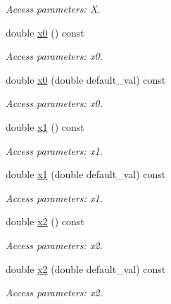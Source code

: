 \begin{DoxyCompactItemize}
\begin{DoxyCompactList}\small\item\em Access parameters: X. \item\end{DoxyCompactList}\item 
double \hyperlink{struct_d_d4hep_1_1_x_m_l_1_1_dimension_a6d683ef00556655f120526b2ed32b805}{x0} () const 
\begin{DoxyCompactList}\small\item\em Access parameters: x0. \item\end{DoxyCompactList}\item 
double \hyperlink{struct_d_d4hep_1_1_x_m_l_1_1_dimension_abb8c3f1185f84d41aa23b2650723290e}{x0} (double default\_\-val) const 
\begin{DoxyCompactList}\small\item\em Access parameters: x0. \item\end{DoxyCompactList}\item 
double \hyperlink{struct_d_d4hep_1_1_x_m_l_1_1_dimension_a6ab0a2e9f1c1b8b32bedb25bd8a86c03}{x1} () const 
\begin{DoxyCompactList}\small\item\em Access parameters: x1. \item\end{DoxyCompactList}\item 
double \hyperlink{struct_d_d4hep_1_1_x_m_l_1_1_dimension_aa4a60a2ff14e89139f2f4070f242db28}{x1} (double default\_\-val) const 
\begin{DoxyCompactList}\small\item\em Access parameters: x1. \item\end{DoxyCompactList}\item 
double \hyperlink{struct_d_d4hep_1_1_x_m_l_1_1_dimension_ab7251c41012d03e5ffcac14b3d3fa5c0}{x2} () const 
\begin{DoxyCompactList}\small\item\em Access parameters: x2. \item\end{DoxyCompactList}\item 
double \hyperlink{struct_d_d4hep_1_1_x_m_l_1_1_dimension_a98a1821ca04622f93b8ab259b978979e}{x2} (double default\_\-val) const 
\begin{DoxyCompactList}\small\item\em Access parameters: x2. \item\end{DoxyCompactList}\item 

\end{DoxyCompactItemize}
